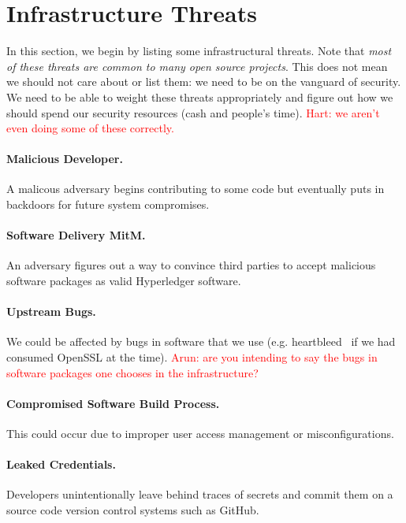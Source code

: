 
\section{Infrastructure Threats}

In this section, we begin by listing some infrastructural threats.  Note that \emph{most of these threats are common to many open source projects}.  This does not mean we should not care about or list them:  we need to be on the vanguard of security.  We need to be able to weight these threats appropriately and figure out how we should spend our security resources (cash and people's time). \textcolor{red}{Hart: we aren't even doing some of these correctly.}

\paragraph{Malicious Developer.}  A malicous adversary begins contributing to some code but eventually puts in backdoors for future system compromises.

\paragraph{Software Delivery MitM.}  An adversary figures out a way to convince third parties to accept malicious software packages as valid Hyperledger software.

\paragraph{Upstream Bugs.}  We could be affected by bugs in software that we use (e.g. heartbleed~\cite{durumeric2014matter} if we had consumed OpenSSL at the time). \textcolor{red}{Arun: are you intending to say the bugs in software packages one chooses in the infrastructure?}

\paragraph{Compromised Software Build Process.}  This could occur due to improper user access management or misconfigurations.

\paragraph{Leaked Credentials.} Developers unintentionally leave behind traces of secrets and commit them on a source code version control systems such as GitHub.


